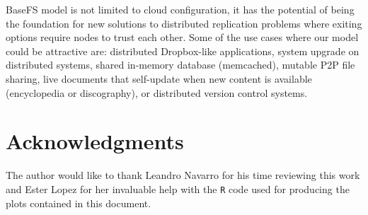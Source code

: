 \documentclass{sig-alternate}
\begin{document}



BaseFS model is not limited to cloud configuration, it has the potential of being the foundation for new solutions to distributed replication problems where exiting options require nodes to trust each other. Some of the use cases where our model could be attractive are: distributed Dropbox-like applications, system upgrade on distributed systems, shared in-memory database (memcached), mutable P2P file sharing, live documents that self-update when new content is available (encyclopedia or discography), or distributed version control systems.

\section{Acknowledgments}
The author would like to thank Leandro Navarro for his time reviewing this work and Ester Lopez for her invaluable help with the \texttt{R} code used for producing the plots contained in this document.

%

%
%
\end{document}
